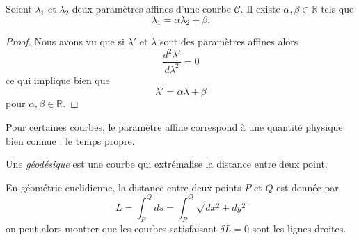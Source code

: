 \documentclass[a4paper,11pt]{report}
\begin{document}
            \begin{prop}\begin{leftbar}
                Soient $\lambda_1$ et $\lambda_2$ deux paramètres affines d'une courbe $\mathscr{C}$. Il existe $\alpha,\beta\in\mathbb{R}$ tels que
                \begin{equation}
                    \lambda_1 = \alpha\lambda_2+\beta.
                \end{equation}
            \end{leftbar}\end{prop}
            
            \begin{proof}
                Nous avons vu que si $\lambda'$ et $\lambda$ sont des paramètres affines alors
                \begin{equation}
                    \frac{d^2\lambda'}{d\lambda^2} = 0
                \end{equation}
                ce qui implique bien que
                \begin{equation}
                    \lambda' = \alpha \lambda + \beta
                \end{equation}
                pour $\alpha,\beta\in\mathbb{R}$.
            \end{proof}
            
            Pour certaines courbes, le paramètre affine correspond à une quantité physique bien connue : le temps propre.
            
            \begin{definition}
                Une \textit{géodésique} est une courbe qui extrémalise la distance entre deux point.
            \end{definition}
            
            \begin{exmp}
                En géométrie euclidienne, la distance entre deux points $P$ et $Q$ est donnée par 
                \begin{equation}
                    L = \int_P^Q ds = \int_P^Q \sqrt{dx^2+dy^2}
                \end{equation}
                on peut alors montrer que les courbes satisfaisant $\delta L = 0$ sont les lignes droites.
            \end{exmp}
            
\end{document}
